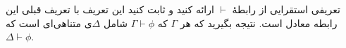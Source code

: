 تعریفی استقرایی از رابطهٔ $\vdash$ ارائه کنید و ثابت کنید این تعریف با تعریف قبلی این رابطه معادل است. نتیجه بگیرید که هر $\Gamma$ که $\Gamma\vdash\phi$ شامل $\Delta$ی متناهی‌ای است که $\Delta\vdash\phi$.